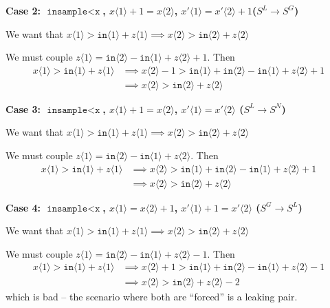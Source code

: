 \documentclass[12pt]{article}
\newcommand{\lguard}[1][x]{\texttt{insample} < \texttt{#1}}
\newcommand{\brangle}[1]{\langle #1 \rangle}
\theoremstyle{definition}
\begin{document}
\textbf{Case 2: $\lguard$, $x\langle 1 \rangle + 1 = x \langle 2\rangle$, $x'\langle 1 \rangle = x' \langle 2\rangle+1$($S^L\to S^G$)}

We want that $x\langle 1 \rangle > \texttt{in}\langle 1\rangle + z\brangle{1}\implies x \brangle{2} > \texttt{in}\brangle{2} + z\brangle{2}$

We must couple $z\brangle{1} =\texttt{in}\brangle{2}-\texttt{in}\brangle{1} +z\brangle{2}+1$.
Then \begin{align*}
	x\langle 1 \rangle > \texttt{in}\langle 1\rangle + z\brangle{1}&\implies x\brangle{2}-1 > \texttt{in}\brangle{1} + \texttt{in}\brangle{2}-\texttt{in}\brangle{1} +z\brangle{2}+1\\
	&\implies x\brangle{2} > \texttt{in}\brangle{2} + z\brangle{2}
\end{align*}

\textbf{Case 3: $\lguard$, $x\langle 1 \rangle + 1 = x \langle 2\rangle$, $x'\langle 1 \rangle = x' \langle 2\rangle$ ($S^L\to S^N$)}

We want that $x\langle 1 \rangle > \texttt{in}\langle 1\rangle + z\brangle{1}\implies x \brangle{2} > \texttt{in}\brangle{2} + z\brangle{2}$

We must couple $z\brangle{1} =\texttt{in}\brangle{2}-\texttt{in}\brangle{1} +z\brangle{2}$.
Then \begin{align*}
	x\langle 1 \rangle > \texttt{in}\langle 1\rangle + z\brangle{1}&\implies x\brangle{2} > \texttt{in}\brangle{1} + \texttt{in}\brangle{2}-\texttt{in}\brangle{1} +z\brangle{2}+1\\
	&\implies x\brangle{2} > \texttt{in}\brangle{2} + z\brangle{2}
\end{align*}

\textbf{Case 4: $\lguard$, $x\brangle{1}  = x \brangle{2}+1$, $x'\langle 1 \rangle +1 = x' \langle 2\rangle$ ($S^G\to S^L$)}

We want that $x\langle 1 \rangle > \texttt{in}\langle 1\rangle + z\brangle{1}\implies x \brangle{2} > \texttt{in}\brangle{2} + z\brangle{2}$

We must couple $z\brangle{1} =\texttt{in}\brangle{2}-\texttt{in}\brangle{1} +z\brangle{2}-1$.
Then \begin{align*}
	x\langle 1 \rangle > \texttt{in}\langle 1\rangle + z\brangle{1}&\implies x\brangle{2}+1 > \texttt{in}\brangle{1} + \texttt{in}\brangle{2}-\texttt{in}\brangle{1} +z\brangle{2}-1\\
	&\implies x\brangle{2} > \texttt{in}\brangle{2} + z\brangle{2}-2
\end{align*}
which is bad -- the scenario where both are ``forced'' is a leaking pair.
\end{document}
